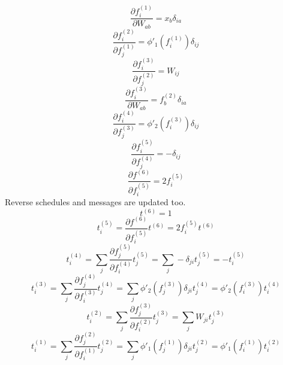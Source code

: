 \documentclass[fleqn]{article}
\begin{document}
\begin{equation}
    \frac{\partial f^{(1)}_i}{\partial W_{ab}} = x_b \delta_{ia}
\end{equation}
\begin{equation}
    \frac{\partial f^{(2)}_i}{\partial f^{(1)}_j} = \phi'_1 \left ( f^{(1)}_i \right ) \delta_{ij}
\end{equation}
\begin{equation}
    \frac{\partial f^{(3)}_i}{\partial f^{(2)}_j} = W_{ij}
\end{equation}
\begin{equation}
    \frac{\partial f^{(3)}_i}{\partial W_{ab}} = f^{(2)}_b \delta_{ia}
\end{equation}
\begin{equation}
    \frac{\partial f^{(4)}_i}{\partial f^{(3)}_j} = \phi'_2 \left ( f^{(3)}_i \right ) \delta_{ij}
\end{equation}
\begin{equation}
    \frac{\partial f^{(5)}_i}{\partial f^{(4)}_j} = - \delta_{ij}
\end{equation}
\begin{equation}
    \frac{\partial f^{(6)}}{\partial f^{(5)}_i} = 2 f^{(5)}_i
\end{equation}
Reverse schedules and messages are updated too.
\begin{equation}
    t^{(6)} = 1
\end{equation}
\begin{equation}
    t^{(5)}_i = \frac{\partial f^{(6)}}{\partial f^{(5)}_i} t^{(6)} = 2 f^{(5)}_i t^{(6)}
\end{equation}
\begin{equation}
    t^{(4)}_i = \sum_j \frac{\partial f^{(5)}_j}{\partial f^{(4)}_i} t^{(5)}_j = \sum_j - \delta_{ji} t^{(5)}_j = - t^{(5)}_i
\end{equation}
\begin{equation}
    t^{(3)}_i = \sum_j \frac{\partial f^{(4)}_j}{\partial f^{(3)}_i} t^{(4)}_j = \sum_j \phi'_2 \left ( f^{(3)}_j \right ) \delta_{ji} t^{(4)}_j = \phi'_2 \left ( f^{(3)}_i \right ) t^{(4)}_i
\end{equation}
\begin{equation}
    t^{(2)}_i = \sum_j \frac{\partial f^{(3)}_j}{\partial f^{(2)}_i} t^{(3)}_j = \sum_j W_{ji} t^{(3)}_j
\end{equation}
\begin{equation}
    t^{(1)}_i = \sum_j \frac{\partial f^{(2)}_j}{\partial f^{(1)}_i} t^{(2)}_j = \sum_j \phi'_1 \left ( f^{(1)}_j \right ) \delta_{ji} t^{(2)}_j = \phi'_1 \left ( f^{(1)}_i \right ) t^{(2)}_i
\end{equation}
\end{document}
